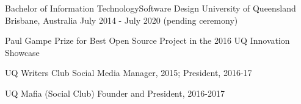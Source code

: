 


\begin{cventries}


\cventry
{Bachelor of Information Technology{\enskip\cdotp\enskip}Software Design} %
{University of Queensland} %
{Brisbane, Australia} %
{July 2014 - July 2020 (pending ceremony)} %
{ %
\begin{cvitems}
\item {Paul Gampe Prize for Best Open Source Project in the 2016 UQ Innovation Showcase}
\item {UQ Writers Club Social Media Manager, 2015; President, 2016-17}
\item {UQ Mafia (Social Club) Founder and President, 2016-2017}
\end{cvitems}
}


\end{cventries}

